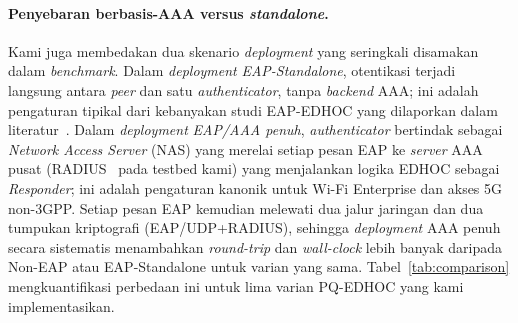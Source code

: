 \documentclass{easychair}
\begin{document}
\paragraph{Penyebaran berbasis-AAA versus \emph{standalone}.}
Kami juga membedakan dua skenario \emph{deployment} yang seringkali
disamakan dalam \emph{benchmark}. Dalam \emph{deployment}
\emph{EAP-Standalone}, otentikasi terjadi langsung antara
\emph{peer} dan satu \emph{authenticator}, tanpa \emph{backend} AAA;
ini adalah pengaturan tipikal dari kebanyakan studi EAP-EDHOC yang
dilaporkan dalam literatur~\cite{LopezGomez2026,RFC-EAP-EDHOC}.
Dalam \emph{deployment} \emph{EAP/AAA penuh}, \emph{authenticator}
bertindak sebagai \emph{Network Access Server} (NAS) yang merelai
setiap pesan EAP ke \emph{server} AAA pusat
(RADIUS~\cite{RFC2865} pada testbed kami) yang menjalankan logika
EDHOC sebagai \emph{Responder}; ini adalah pengaturan kanonik
untuk Wi-Fi Enterprise dan akses 5G non-3GPP. Setiap pesan EAP
kemudian melewati dua jalur jaringan dan dua tumpukan kriptografi
(EAP/UDP+RADIUS), sehingga \emph{deployment} AAA penuh secara
sistematis menambahkan \emph{round-trip} dan \emph{wall-clock}
lebih banyak daripada Non-EAP atau EAP-Standalone untuk varian
yang sama. Tabel~\ref{tab:comparison} mengkuantifikasi perbedaan ini
untuk lima varian PQ-EDHOC yang kami implementasikan.
\end{document}
